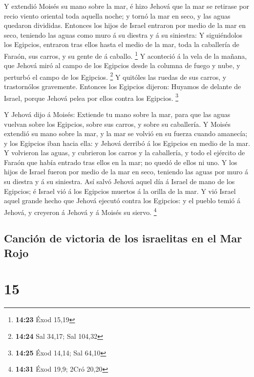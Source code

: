  Y extendió Moisés su mano sobre la mar, é hizo Jehová que
la mar se retirase por recio viento oriental toda aquella noche; y tornó
la mar en seco, y las aguas quedaron divididas.  Entonces
los hijos de Israel entraron por medio de la mar en seco, teniendo las
aguas como muro á su diestra y á su siniestra:  Y
siguiéndolos los Egipcios, entraron tras ellos hasta el medio de la mar,
toda la caballería de Faraón, sus carros, y su gente de á caballo.
\footnote{\textbf{14:23} Éxod 15,19}  Y aconteció á la vela
de la mañana, que Jehová miró al campo de los Egipcios desde la columna
de fuego y nube, y perturbó el campo de los Egipcios. \footnote{\textbf{14:24}
  Sal 34,17; Sal 104,32}  Y quitóles las ruedas de sus
carros, y trastornólos gravemente. Entonces los Egipcios dijeron:
Huyamos de delante de Israel, porque Jehová pelea por ellos contra los
Egipcios. \footnote{\textbf{14:25} Éxod 14,14; Sal 64,10}

 Y Jehová dijo á Moisés: Extiende tu mano sobre la mar,
para que las aguas vuelvan sobre los Egipcios, sobre sus carros, y sobre
su caballería.  Y Moisés extendió su mano sobre la mar, y
la mar se volvió en su fuerza cuando amanecía; y los Egipcios iban hacia
ella: y Jehová derribó á los Egipcios en medio de la mar. 
Y volvieron las aguas, y cubrieron los carros y la caballería, y todo el
ejército de Faraón que había entrado tras ellos en la mar; no quedó de
ellos ni uno.  Y los hijos de Israel fueron por medio de la
mar en seco, teniendo las aguas por muro á su diestra y á su siniestra.
 Así salvó Jehová aquel día á Israel de mano de los
Egipcios; é Israel vió á los Egipcios muertos á la orilla de la mar.
 Y vió Israel aquel grande hecho que Jehová ejecutó contra
los Egipcios: y el pueblo temió á Jehová, y creyeron á Jehová y á Moisés
su siervo. \footnote{\textbf{14:31} Éxod 19,9; 2Cró 20,20}

\hypertarget{canciuxf3n-de-victoria-de-los-israelitas-en-el-mar-rojo}{%
\subsection{Canción de victoria de los israelitas en el Mar
Rojo}\label{canciuxf3n-de-victoria-de-los-israelitas-en-el-mar-rojo}}

\hypertarget{section-14}{%
\section{15}\label{section-14}}

